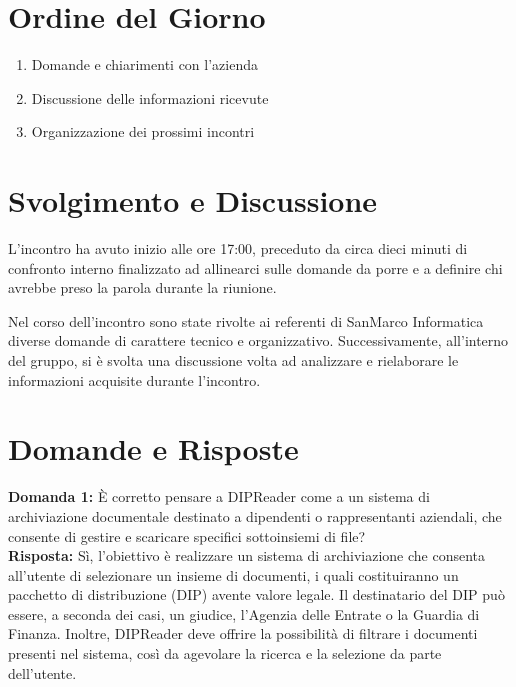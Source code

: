 \documentclass[a4paper,12pt]{article}
\begin{document}
\section{Ordine del Giorno}
\begin{enumerate}
    \item Domande e chiarimenti con l'azienda  
    \item Discussione delle informazioni ricevute 
    \item Organizzazione dei prossimi incontri
\end{enumerate}
\vspace{0.5cm}
\section{Svolgimento e Discussione}
L’incontro ha avuto inizio alle ore 17:00, preceduto da circa dieci minuti di confronto interno finalizzato ad allinearci sulle domande da porre e a definire chi avrebbe preso la parola durante la riunione.

Nel corso dell’incontro sono state rivolte ai referenti di SanMarco Informatica diverse domande di carattere tecnico e organizzativo.
Successivamente, all’interno del gruppo, si è svolta una discussione volta ad analizzare e rielaborare le informazioni acquisite durante l’incontro.

\vspace{0.5cm}

\section{Domande e Risposte}

\textbf{Domanda 1:} È corretto pensare a DIPReader come a un sistema di archiviazione documentale destinato a dipendenti o rappresentanti aziendali, che consente di gestire e scaricare specifici sottoinsiemi di file? \\[0.5em]
\textbf{Risposta:} Sì, l’obiettivo è realizzare un sistema di archiviazione che consenta all’utente di selezionare un insieme di documenti, i quali costituiranno un pacchetto di distribuzione (DIP) avente valore legale.
Il destinatario del DIP può essere, a seconda dei casi, un giudice, l’Agenzia delle Entrate o la Guardia di Finanza.
Inoltre, DIPReader deve offrire la possibilità di filtrare i documenti presenti nel sistema, così da agevolare la ricerca e la selezione da parte dell’utente.

\vspace{2em}
\end{document}
